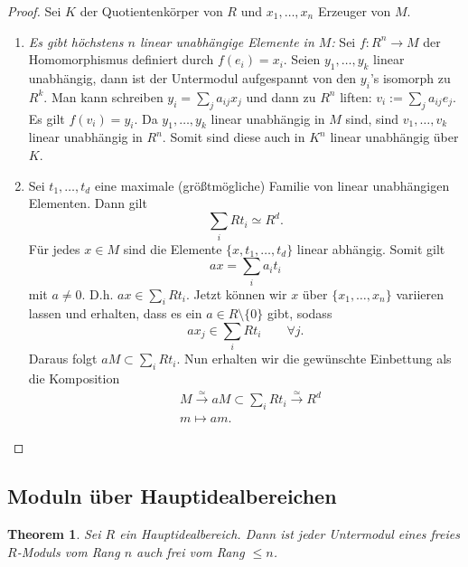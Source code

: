 \documentclass[reqno,12pt]{article}
\numberwithin{equation}{section}
\newcommand{\iso}{\simeq}
\theoremstyle{plain}
\newtheorem{thm}{Theorem}[section]
\theoremstyle{definition}
\begin{document}
\begin{proof}
Sei $K$ der Quotientenkörper von $R$ und $x_1, \dots, x_n$ Erzeuger von $M$.

\begin{enumerate}
  \item {\it Es gibt höchstens $n$ linear unabhängige Elemente in $M$:} Sei $f \colon R^n \to M$ der Homomorphismus definiert durch $f(e_i) = x_i$. Seien $y_1, \dots ,y_k$ linear unabhängig, dann ist der Untermodul aufgespannt von den $y_i$'s isomorph zu $R^k$. Man kann schreiben $y_i = \sum_{j} a_{ij} x_j$ und dann zu $R^n$ liften: $v_i := \sum_{j} a_{ij} e_j$. Es gilt $f(v_i) = y_i$. Da $y_1, \dots ,y_k$ linear unabhängig in $M$ sind, sind $v_1, \dots ,v_k$ linear unabhängig in $R^n$. Somit sind diese auch in $K^n$ linear unabhängig über $K$.

  \item Sei $t_1, \dots , t_d$ eine maximale (größtmögliche) Familie von linear unabhängigen Elementen. Dann gilt
  $$
  \sum_i R t_i \iso R^d.
  $$
  Für jedes $x \in M$ sind die Elemente $\{x, t_1, \dots, t_d\}$ linear abhängig. Somit gilt
  $$
  ax = \sum_i a_i t_i
  $$
  mit $a \neq 0$. D.h. $ax \in \sum_i R t_i$. Jetzt können wir $x$ über $\{ x_1, \dots, x_n \}$ variieren lassen und erhalten, dass es ein $a \in R \setminus \{0\}$ gibt, sodass
  $$
  ax_j \in \sum_i R t_i \qquad \forall j.
  $$
  Daraus folgt $aM \subset \sum_i R t_i$. Nun erhalten wir die gewünschte Einbettung als die Komposition
  \begin{align*}
  & M \overset{\iso}{\to} aM \subset \sum_i R t_i \overset{\iso}{\to} R^d \\
  & m \mapsto am.
  \end{align*}

\end{enumerate}
\end{proof}


\subsection{Moduln über Hauptidealbereichen}

\begin{thm}
Sei $R$ ein Hauptidealbereich. Dann ist jeder Untermodul eines freies $R$-Moduls vom Rang $n$ auch frei vom Rang $\leq n$.
\end{thm}
\end{document}
